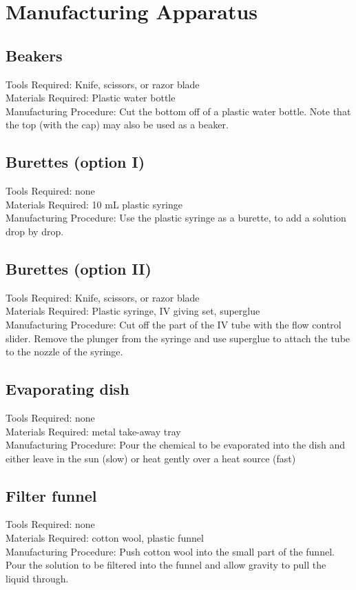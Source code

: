 \section{Manufacturing Apparatus}

\subsection{Beakers}
Tools Required: Knife, scissors, or razor blade\\
Materials Required: Plastic water bottle\\
Manufacturing Procedure: Cut the bottom off of a plastic water bottle. Note that the top (with the cap) may also be used as a beaker.

\subsection{Burettes (option I)}
Tools Required: none\\
Materials Required: 10 mL plastic syringe\\
Manufacturing Procedure: Use the plastic syringe as a burette, to add a solution drop by drop.

\subsection{Burettes (option II)}
Tools Required: Knife, scissors, or razor blade\\
Materials Required: Plastic syringe, IV giving set, superglue\\
Manufacturing Procedure: Cut off the part of the IV tube with the flow control slider. Remove the plunger from the syringe and use superglue to attach the tube to the nozzle of the syringe.

\subsection{Evaporating dish}
Tools Required: none\\
Materials Required: metal take-away tray\\
Manufacturing Procedure: Pour the chemical to be evaporated into the dish and either leave in the sun (slow) or heat gently over a heat source (fast)

\subsection{Filter funnel}
Tools Required: none\\
Materials Required: cotton wool, plastic funnel\\
Manufacturing Procedure: Push cotton wool into the small part of the funnel. Pour the solution to be filtered into the funnel and allow gravity to pull the liquid through.

